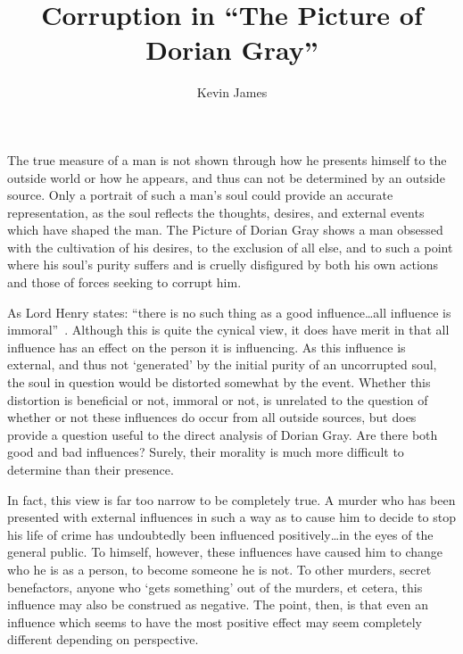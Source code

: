 \documentclass[12pt]{article}
\begin{document}
\title{Corruption in ``The Picture of Dorian Gray''}
\author{Kevin James}
\maketitle

\section*{}
The true measure of a man is not shown through how he presents himself to the outside world or how he appears, and thus can not be determined by an outside source. Only a portrait of such a man's soul could provide an accurate representation, as the soul reflects the thoughts, desires, and external events which have shaped the man. The Picture of Dorian Gray shows a man obsessed with the cultivation of his desires, to the exclusion of all else, and to such a point where his soul's purity suffers and is cruelly disfigured by both his own actions and those of forces seeking to corrupt him.

As Lord Henry states: ``there is no such thing as a good influence\dots all influence is immoral''~\cite[23]{wilde}. Although this is quite the cynical view, it does have merit in that all influence has an effect on the person it is influencing. As this influence is external, and thus not `generated' by the initial purity of an uncorrupted soul, the soul in question would be distorted somewhat by the event. Whether this distortion is beneficial or not, immoral or not, is unrelated to the question of whether or not these influences do occur from all outside sources, but does provide a question useful to the direct analysis of Dorian Gray. Are there both good and bad influences? Surely, their morality is much more difficult to determine than their presence.

In fact, this view is far too narrow to be completely true. A murder who has been presented with external influences in such a way as to cause him to decide to stop his life of crime has undoubtedly been influenced positively\dots in the eyes of the general public. To himself, however, these influences have caused him to change who he is as a person, to become someone he is not. To other murders, secret benefactors, anyone who `gets something' out of the murders, et cetera, this influence may also be construed as negative. The point, then, is that even an influence which seems to have the most positive effect may seem completely different depending on perspective.
\end{document}
